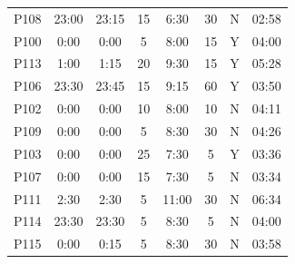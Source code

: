 \begin{table}[h!tb]
\begin{tabular}{cccccccc}
		P108 &  23:00 & 23:15 & 15 & 6:30  & 30 & N & 02:58\\ 
		P100 &  0:00  & 0:00  & 5  & 8:00  & 15 & Y & 04:00\\
		P113 &  1:00  & 1:15  & 20 & 9:30  & 15 & Y & 05:28\\ 
		P106 &  23:30 & 23:45 & 15 & 9:15  & 60 & Y & 03:50\\ 
		P102 &  0:00  & 0:00  & 10 & 8:00  & 10 & N & 04:11\\ 
		P109 &  0:00  & 0:00  & 5  & 8:30  & 30 & N & 04:26\\ 
		P103 &  0:00  & 0:00  & 25 & 7:30  & 5  & Y & 03:36\\ 
		P107 &  0:00  & 0:00  & 15 & 7:30  & 5  & N & 03:34\\ 
		P111 &  2:30  & 2:30  & 5  & 11:00 & 30 & N & 06:34\\ 
		P114 &  23:30 & 23:30 & 5  & 8:30  & 5  & N & 04:00\\ 
		P115 &  0:00  & 0:15  & 5  & 8:30  & 30 & N & 03:58\\ \hline
	\end{tabular}\vspace{0.2cm}
	\label{tab:supptab1}
\end{table}


